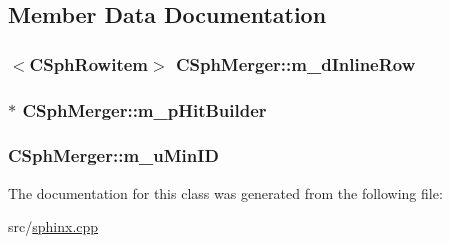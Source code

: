 \subsection{Member Data Documentation}
\hypertarget{classCSphMerger_a38fdfaaaba3f0f52ab25c3e9e385681b}{
\subsubsection[{m\-\_\-d\-Inline\-Row}]{$<${\bf C\-Sph\-Rowitem}$>$ C\-Sph\-Merger\-::m\-\_\-d\-Inline\-Row\hspace{0.3cm}{\ttfamily [private]}}}\label{classCSphMerger_a38fdfaaaba3f0f52ab25c3e9e385681b}
\hypertarget{classCSphMerger_a007c577963e11daa92b018e026c6b755}{
\subsubsection[{m\-\_\-p\-Hit\-Builder}]{$\ast$ C\-Sph\-Merger\-::m\-\_\-p\-Hit\-Builder\hspace{0.3cm}{\ttfamily [private]}}}\label{classCSphMerger_a007c577963e11daa92b018e026c6b755}
\hypertarget{classCSphMerger_a85e280118c793240be1b768f89d27513}{
\subsubsection[{m\-\_\-u\-Min\-I\-D}]{ C\-Sph\-Merger\-::m\-\_\-u\-Min\-I\-D\hspace{0.3cm}{\ttfamily [private]}}}\label{classCSphMerger_a85e280118c793240be1b768f89d27513}


The documentation for this class was generated from the following file\-:\begin{DoxyCompactItemize}
\item 
src/\hyperlink{sphinx_8cpp}{sphinx.\-cpp}\end{DoxyCompactItemize}

